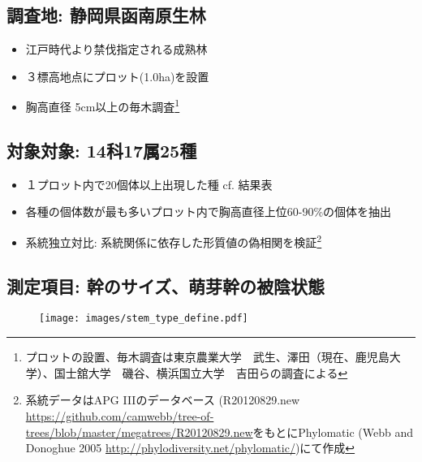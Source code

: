 \documentclass[a0, 30pt, plainboxedsections, draft]{sciposter} %
\begin{document}
\begin{multicols}{2}%

\subsection*{調査地: 静岡県函南原生林}

\begin{itemize}\setlength{\itemindent}{0.6em}
  \item 江戸時代より禁伐指定される成熟林
  \item ３標高地点にプロット(1.0ha)を設置
  \item 胸高直径 5cm以上の毎木調査\footnote{プロットの設置、毎木調査は東京農業大学　武生、澤田（現在、鹿児島大学）、国士舘大学　磯谷、横浜国立大学　吉田らの調査による}
\end{itemize}

\subsection*{対象対象: 14科17属25種}

\begin{itemize}\setlength{\itemindent}{0.6em}
  \item １プロット内で20個体以上出現した種 cf. 結果表
  \item 各種の個体数が最も多いプロット内で胸高直径上位60-90\%の個体を抽出
  \item 系統独立対比: 系統関係に依存した形質値の偽相関を検証\footnote{系統データはAPG I\hspace{-1pt}I\hspace{-1pt}Iのデータベース (R20120829.new \url{https://github.com/camwebb/tree-of-trees/blob/master/megatrees/R20120829.new}をもとにPhylomatic (Webb and Donoghue 2005 \url{http://phylodiversity.net/phylomatic/})にて作成}
\end{itemize}

\columnbreak
\subsection*{測定項目: 幹のサイズ、萌芽幹の被陰状態}

\begin{figure}
	\texttt{[image: images/stem\_type\_define.pdf]}
\end{figure}

\vspace{-1.8em}\begin{figure}
 \begin{minipage}{0.6\hsize}

\end{minipage}
\end{figure}
\end{multicols}
\end{document}
